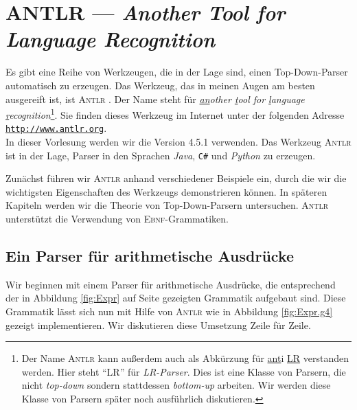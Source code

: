 \chapter[ANTLR]{ANTLR --- \emph{Another Tool for Language Recognition}}
Es gibt eine Reihe von Werkzeugen, die in der Lage sind, einen Top-Down-Parser automatisch
zu erzeugen.  Das Werkzeug, das in meinen Augen am besten ausgereift ist, ist
\textsc{Antlr} \cite{parr:2012,parr:2013}.  Der Name steht f\"ur 
\emph{\underline{an}other \underline{t}ool for \underline{l}anguage \underline{r}ecognition}\footnote{
Der Name \textsc{Antlr} kann au{\ss}erdem auch als Abk\"urzung f\"ur \underline{ant}i \underline{LR} verstanden
werden. Hier steht ``LR'' f\"ur \emph{LR-Parser}.  Dies ist eine Klasse von Parsern, die nicht \emph{top-down} 
sondern stattdessen \emph{bottom-up} arbeiten.  Wir werden diese Klasse von Parsern sp\"ater noch ausf\"uhrlich 
diskutieren.
}.
Sie finden dieses Werkzeug im Internet unter der folgenden Adresse 
\\[0.2cm]
\hspace*{1.3cm}
\href{http://www.antlr.org}{\texttt{http://www.antlr.org}}.
\\[0.2cm]
In dieser Vorlesung werden wir die Version 4.5.1 verwenden.  Das Werkzeug \textsc{Antlr} ist in der
Lage, Parser in den Sprachen \textsl{Java}, \texttt{C\#} und \textsl{Python} zu erzeugen.

Zun\"achst f\"uhren wir \textsc{Antlr} anhand verschiedener Beispiele ein, durch die wir die 
wichtigsten Eigenschaften des Werkzeugs demonstrieren k\"onnen.  In sp\"ateren Kapiteln werden wir
die Theorie von Top-Down-Parsern untersuchen.
\textsc{Antlr} unterst\"utzt die Verwendung von \textsc{Ebnf}-Grammatiken.  


\section{Ein Parser f\"ur arithmetische Ausdr\"ucke}
Wir beginnen mit einem Parser f\"ur arithmetische Ausdr\"ucke, die entsprechend der in
Abbildung \ref{fig:Expr} auf Seite \pageref{fig:Expr} gezeigten Grammatik aufgebaut sind.
Diese Grammatik l\"asst sich nun mit Hilfe von \textsc{Antlr} wie in Abbildung
\ref{fig:Expr.g4} gezeigt implementieren.  Wir diskutieren diese Umsetzung Zeile f\"ur Zeile.

